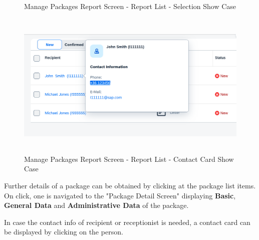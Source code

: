 \begin{figure}[H]
	\centering
	\hspace{5pt}
    \caption{Manage Packages Report Screen - Report List - Selection Show Case}
	\label{fig:MPListSelection}
\end{figure}

\begin{figure}[H]
	\centering
	\includegraphics[height=200pt]{images/user_doc/managePack/ReportScreen/browse/contactcard.png}
	\caption{Manage Packages Report Screen - Report List - Contact Card Show Case}
	\label{fig:MPReportCOntactCard}
\end{figure}

Further details of a package can be obtained by clicking at the package list items. On click, one is navigated to the "Package Detail Screen" displaying \textbf{Basic}, \textbf{General Data} and \textbf{Administrative Data} of the package.

In case the contact info of recipient or receptionist is needed, a contact card can be displayed by clicking on the person.

